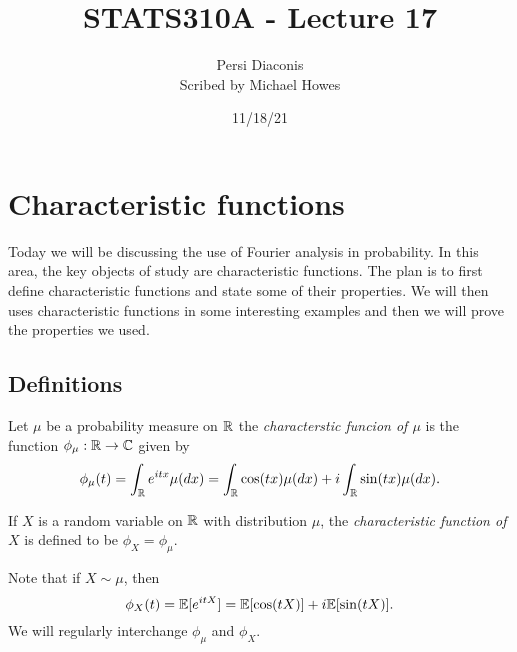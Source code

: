 




\title{STATS310A - Lecture 17}
\author{Persi Diaconis\\ Scribed by Michael Howes}
\date{11/18/21}

\pagestyle{fancy}
\fancyhf{}


\maketitle
\tableofcontents
\section{Characteristic functions}
Today we will be discussing the use of Fourier analysis in probability. In this area, the key objects of study are characteristic functions. The plan is to first define characteristic functions and state some of their properties. We will then uses characteristic functions in some interesting examples and then we will prove the properties we used.
\subsection{Definitions}

\begin{defn}
    Let $\mu$ be a probability measure on ${\mathbb R}$ the \emph{characterstic funcion of $\mu$} is the function $\phi_\mu : {\mathbb R} \to {\mathbb C}$ given by 
    \[\phi_\mu(t) = \int_{\mathbb R} e^{itx}\mu(dx) = \int_{\mathbb R} \cos(tx)\mu(dx) + i\int_{\mathbb R} \sin(tx)\mu(dx). \]
\end{defn}
\begin{defn}
    If $X$ is a random variable on ${\mathbb R}$ with distribution $\mu$, the \emph{characteristic function of $X$} is defined to be $\phi_X = \phi_\mu$.
\end{defn}
Note that if $X \sim \mu$, then
\[\phi_X(t) = {\mathbb{E}}[e^{itX}] = {\mathbb{E}}[\cos(tX)]+i{\mathbb{E}}[\sin(tX)]. \]
We will regularly interchange $\phi_\mu$ and $\phi_X$.
